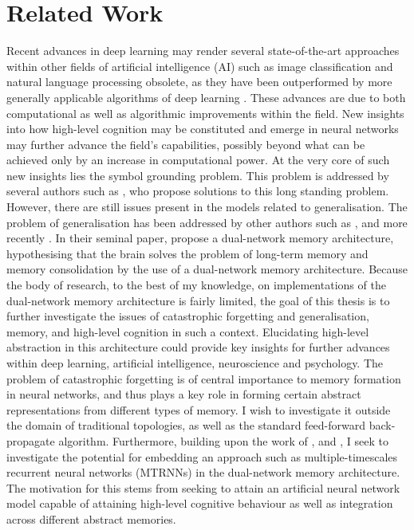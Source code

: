 
\chapter{Related Work}

Recent advances in deep learning may render several state-of-the-art approaches within other fields of artificial intelligence (AI) such as image classification and natural language processing obsolete, as they have been outperformed by more generally applicable algorithms of deep learning \citep{LeCun2015, Schmidhuber2014}. These advances are due to both computational as well as algorithmic improvements within the field. New insights into how high-level cognition may be constituted and emerge in neural networks may further advance the field's capabilities, possibly beyond what can be achieved only by an increase in computational power. At the very core of such new insights lies the symbol grounding problem. This problem is addressed by several authors such as \cite{Yamashita2008, Tani2014}, who propose solutions to this long standing problem. However, there are still issues present in the models related to generalisation. The problem of generalisation has been addressed by other authors such as \cite{McClelland1995}, and more recently \cite{Hattori2014}. In their seminal paper, \cite{McClelland1995} propose a dual-network memory architecture, hypothesising that the brain solves the problem of long-term memory and memory consolidation by the use of a dual-network memory architecture. Because the body of research, to the best of my knowledge, on implementations of the dual-network memory architecture is fairly limited, the goal of this thesis is to further investigate the issues of catastrophic forgetting and generalisation, memory, and high-level cognition in such a context. Elucidating high-level abstraction in this architecture could provide key insights for further advances within deep learning, artificial intelligence, neuroscience and psychology. The problem of catastrophic forgetting is of central importance to memory formation in neural networks, and thus plays a key role in forming certain abstract representations from different types of memory. I wish to investigate it outside the domain of traditional topologies, as well as the standard feed-forward back-propagate algorithm. Furthermore, building upon the work of \cite{Hattori2014}, and \cite{Yamashita2008}, I seek to investigate the potential for embedding an approach such as multiple-timescales recurrent neural networks (MTRNNs) in the dual-network memory architecture. The motivation for this stems from seeking to attain an artificial neural network model capable of attaining high-level cognitive behaviour as well as integration across different abstract memories.

